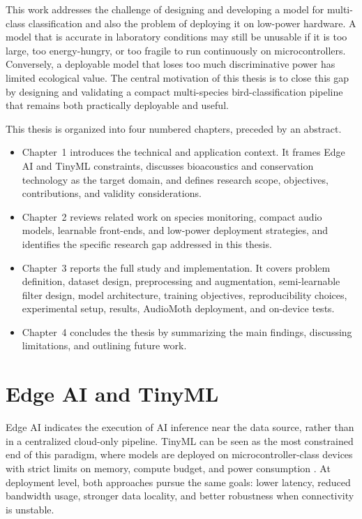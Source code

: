 \documentclass[a4paper,singleside,12pt]{report} %
\begin{document}
	This work addresses the challenge of designing and developing a model for multi-class classification and also the problem of deploying it on low-power hardware. A model that is accurate in laboratory conditions may still be unusable if it is too large, too energy-hungry, or too fragile to run continuously on microcontrollers. Conversely, a deployable model that loses too much discriminative power has limited ecological value. The central motivation of this thesis is to close this gap by designing and validating a compact multi-species bird-classification pipeline that remains both practically deployable and useful.

	This thesis is organized into four numbered chapters, preceded by an abstract.

	\begin{itemize}
		\item Chapter~1 introduces the technical and application context. It frames Edge AI and TinyML constraints, discusses bioacoustics and conservation technology as the target domain, and defines research scope, objectives, contributions, and validity considerations.
		\item Chapter~2 reviews related work on species monitoring, compact audio models, learnable front-ends, and low-power deployment strategies, and identifies the specific research gap addressed in this thesis.
		\item Chapter~3 reports the full study and implementation. It covers problem definition, dataset design, preprocessing and augmentation, semi-learnable filter design, model architecture, training objectives, reproducibility choices, experimental setup, results, AudioMoth deployment, and on-device tests.
		\item Chapter~4 concludes the thesis by summarizing the main findings, discussing limitations, and outlining future work.
	\end{itemize}

	\section{Edge AI and TinyML}
	Edge AI indicates the execution of AI inference near the data source, rather than in a centralized cloud-only pipeline. TinyML can be seen as the most constrained end of this paradigm, where models are deployed on microcontroller-class devices with strict limits on memory, compute budget, and power consumption \cite{abadade2023tinymlsurvey,singh2023edgeaisurvey}. At deployment level, both approaches pursue the same goals: lower latency, reduced bandwidth usage, stronger data locality, and better robustness when connectivity is unstable.
\end{document}
